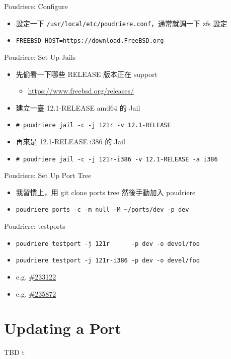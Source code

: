 \documentclass[aspectratio=169]{beamer}
\begin{document}
\begin{frame}[t,fragile]{Poudriere: Configure}
  \begin{itemize}
    \item 設定一下 \verb`/usr/local/etc/poudriere.conf`，通常就調一下 zfs 設定
    \item \verb`FREEBSD_HOST=https://download.FreeBSD.org`
  \end{itemize}
\end{frame}

\begin{frame}[t,fragile]{Poudriere: Set Up Jails}
  \begin{itemize}
    \item<1-> 先偷看一下哪些 RELEASE 版本正在 support
      \begin{itemize}
        \item \href{https://www.freebsd.org/releases/}{https://www.freebsd.org/releases/}
      \end{itemize}

    \item<2-> 建立一臺 12.1-RELEASE amd64 的 Jail
    \item<2-> \verb`# poudriere jail -c -j 121r -v 12.1-RELEASE`
    \item<3-> 再來是 12.1-RELEASE i386 的 Jail
    \item<3-> \verb`# poudriere jail -c -j 121r-i386 -v 12.1-RELEASE -a i386`
  \end{itemize}
\end{frame}

\begin{frame}[t,fragile]{Poudriere: Set Up Port Tree}
  \begin{itemize}
    \item 我習慣上，用 git clone ports tree 然後手動加入 poudriere
    \item \verb`poudriere ports -c -m null -M ~/ports/dev -p dev`
  \end{itemize}
\end{frame}

\begin{frame}[t,fragile]{Poudriere: testports}
  \begin{itemize}
    \item \verb`poudriere testport -j 121r      -p dev -o devel/foo`
    \item \verb`poudriere testport -j 121r-i386 -p dev -o devel/foo`
    \item e.g. \href{https://bugs.freebsd.org/bugzilla/show_bug.cgi?id=233122}{\#233122}
    \item e.g. \href{https://bugs.freebsd.org/bugzilla/show_bug.cgi?id=235872}{\#235872}
  \end{itemize}
\end{frame}

\section{Updating a Port}
\begin{frame}[t]{TBD}
  t
\end{frame}
\end{document}
